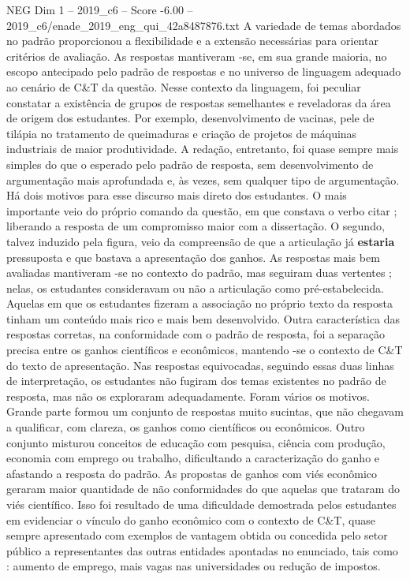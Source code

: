 \begin{textsample}{NEG Dim 1 – 2019\_c6 – Score -6.00 – 2019\_c6/enade\_2019\_eng\_qui\_42a8487876.txt}
A variedade de temas abordados no padrão proporcionou a flexibilidade e a extensão necessárias para orientar critérios de avaliação.
As respostas mantiveram -se, em sua grande maioria, no escopo antecipado pelo padrão de respostas e no universo de linguagem adequado ao cenário de C\&T da questão.
Nesse contexto da linguagem, foi peculiar constatar a existência de grupos de respostas semelhantes e reveladoras da área de origem dos estudantes.
Por exemplo, desenvolvimento de vacinas, pele de tilápia no tratamento de queimaduras e criação de projetos de máquinas industriais de maior produtividade.
A redação, entretanto, foi quase sempre mais simples do que o esperado pelo padrão de resposta, sem desenvolvimento de argumentação mais aprofundada e, às vezes, sem qualquer tipo de argumentação.
Há dois motivos para esse discurso mais direto dos estudantes.
O mais importante veio do próprio comando da questão, em que constava o verbo citar ; liberando a resposta de um compromisso maior com a dissertação.
O segundo, talvez induzido pela figura, veio da compreensão de que a articulação já \textbf{estaria} pressuposta e que bastava a apresentação dos ganhos.
As respostas mais bem avaliadas mantiveram -se no contexto do padrão, mas seguiram duas vertentes ; nelas, os estudantes consideravam ou não a articulação como pré-estabelecida.
Aquelas em que os estudantes fizeram a associação no próprio texto da resposta tinham um conteúdo mais rico e mais bem desenvolvido.
Outra característica das respostas corretas, na conformidade com o padrão de resposta, foi a separação precisa entre os ganhos científicos e econômicos, mantendo -se o contexto de C\&T do texto de apresentação.
Nas respostas equivocadas, seguindo essas duas linhas de interpretação, os estudantes não fugiram dos temas existentes no padrão de resposta, mas não os exploraram adequadamente.
Foram vários os motivos.
Grande parte formou um conjunto de respostas muito sucintas, que não chegavam a qualificar, com clareza, os ganhos como científicos ou econômicos.
Outro conjunto misturou conceitos de educação com pesquisa, ciência com produção, economia com emprego ou trabalho, dificultando a caracterização do ganho e afastando a resposta do padrão.
As propostas de ganhos com viés econômico geraram maior quantidade de não conformidades do que aquelas que trataram do viés científico.
Isso foi resultado de uma dificuldade demostrada pelos estudantes em evidenciar o vínculo do ganho econômico com o contexto de C\&T, quase sempre apresentado com exemplos de vantagem obtida ou concedida pelo setor público a representantes das outras entidades apontadas no enunciado, tais como : aumento de emprego, mais vagas nas universidades ou redução de impostos.

\end{textsample}

